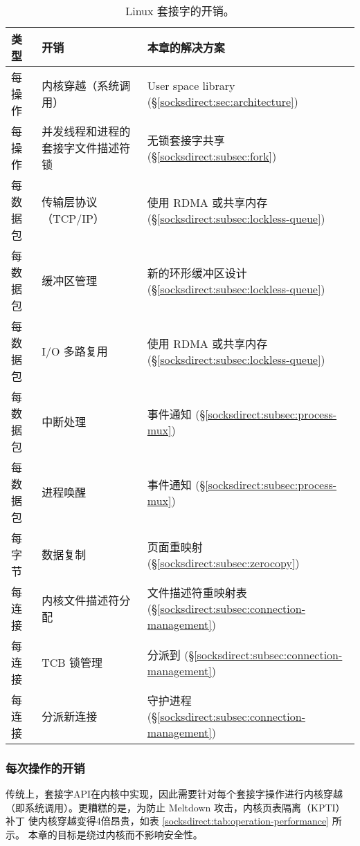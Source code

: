\begin{table}[t]
	\centering
	\caption{Linux 套接字的开销。}
	\label{socksdirect:tab:overhead}
	\small
		\begin{tabularx}{1\textwidth}{l|X|X}
			\hline
			类型 & 开销 & 本章的解决方案 \\
			\hline
			\hline
			每操作 & 内核穿越（系统调用） & User space library (\S\ref{socksdirect:sec:architecture}) \\
			\hline
			每操作 & 并发线程和进程的套接字文件描述符锁 & 无锁套接字共享 (\S\ref{socksdirect:subsec:fork}) \\
			\hline
			\hline
			每数据包 & 传输层协议（TCP/IP） & 使用 RDMA 或共享内存 (\S\ref{socksdirect:subsec:lockless-queue}) \\
			\hline
			每数据包 & 缓冲区管理 & 新的环形缓冲区设计 (\S\ref{socksdirect:subsec:lockless-queue}) \\
			\hline
			每数据包 & I/O 多路复用 & 使用 RDMA 或共享内存 (\S\ref{socksdirect:subsec:lockless-queue}) \\
			\hline
			每数据包 & 中断处理 & 事件通知 (\S\ref{socksdirect:subsec:process-mux}) \\
			\hline
			每数据包 & 进程唤醒 & 事件通知 (\S\ref{socksdirect:subsec:process-mux}) \\
			\hline
			\hline
			每字节 & 数据复制 & 页面重映射 (\S\ref{socksdirect:subsec:zerocopy}) \\
			\hline
			\hline
			每连接  & 内核文件描述符分配 & 文件描述符重映射表 (\S\ref{socksdirect:subsec:connection-management}) \\
			\hline
			每连接 & TCB 锁管理 & 分派到 \libipc{} (\S\ref{socksdirect:subsec:connection-management}) \\
			\hline
			每连接 & 分派新连接 & 守护进程 (\S\ref{socksdirect:subsec:connection-management}) \\
			\hline
		\end{tabularx}
\end{table}

\subsubsection{每次操作的开销}
\label{socksdirect:subsec:per-operation-overhead}

传统上，套接字API在内核中实现，因此需要针对每个套接字操作进行内核穿越（即系统调用）。更糟糕的是，为防止 Meltdown \cite {Lipp2018meltdown} 攻击，内核页表隔离（KPTI）补丁 \cite {kpti} 使内核穿越变得4倍昂贵，如表 \ref {socksdirect:tab:operation-performance} 所示。
本章的目标是绕过内核而不影响安全性。

